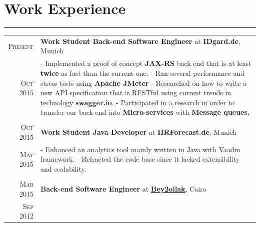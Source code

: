 \documentclass[a4paper,13pt]{article}
\begin{document}
\begin{adjustwidth}{-3cm}{}
\begin{figure}
\end{figure}






\section{Work Experience}
\rule[0pt]{20cm}{0.5pt}

\begin{tabular}{r|p{17.5cm}}
		
\textsc{Present} & \textbf{Work Student Back-end Software Engineer} at \textbf{IDgard.de}, Munich \\
\textsc{Oct 2015} & \footnotesize{
	- Implemented a proof of concept \textbf{JAX-RS} back end that is at least \textbf{twice} as fast than the current one.\newline
	- Ran several performance and stress tests using \textbf{Apache JMeter} \newline
	- Researched on how to write a new API specification that is RESTful using current trends in technology \textbf{swagger.io}. \newline
	- Participated in a research in order to transfer our back-end into \textbf{Micro-services} with \textbf{Message queues.}
}
\\ \multicolumn{2}{c}{}\\


\textsc{Oct 2015} & \textbf{Work Student Java Developer} at \textbf{HRForecast.de}, Munich \\
\textsc{May 2015} & \footnotesize{ - Enhanced an analytics tool mainly written in Java with Vaadin framework. \newline
- Refracted the code base since it lacked extensibility and scalability.
} \\ 
\multicolumn{2}{c}{} \\


\textsc{Mar 2015} & \textbf{Back-end Software Engineer} at \href{http://desktop.bey2ollak.com/features-mentions/}{\textbf{Bey2ollak}}, Cairo \\
\textsc{Sep 2012} & 


\end{tabular}
\end{adjustwidth}
\end{document}
